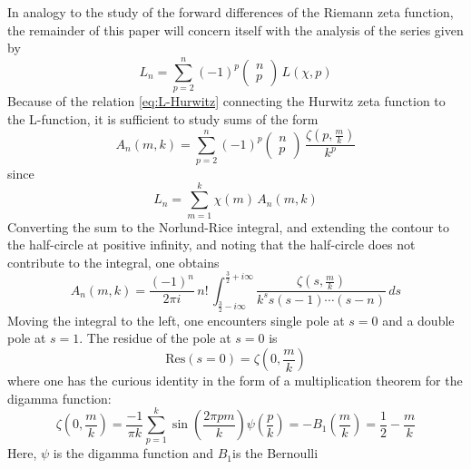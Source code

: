 \documentclass{amsart}
\begin{document}
\begin{comment}
Caution: I switched notation in the following, but haven't yet double-checked.
There may be errors.
\end{comment}
In analogy to the study of the forward differences of the Riemann
zeta function, the remainder of this paper will concern itself with
the analysis of the series given by \begin{equation}
L_{n}=\sum_{p=2}^{n}(-1)^{p}\left(\begin{array}{c}
n\\
p\end{array}\right)\, L(\chi,p)\label{eq:L-coeff}\end{equation}
 Because of the relation \ref{eq:L-Hurwitz} connecting the Hurwitz
zeta function to the L-function, it is sufficient to study sums of
the form\begin{equation}
A_{n}(m,k)=\sum_{p=2}^{n}(-1)^{p}\left(\begin{array}{c}
n\\
p\end{array}\right)\,\frac{\zeta\left(p,\frac{m}{k}\right)}{k^{p}}\label{eq:}\end{equation}
 since \begin{equation}
L_{n}=\sum_{m=1}^{k}\chi(m)\, A_{n}(m,k)\label{eq:}\end{equation}
 Converting the sum to the Norlund-Rice integral, and extending the
contour to the half-circle at positive infinity, and noting that the
half-circle does not contribute to the integral, one obtains \begin{equation}
A_{n}(m,k)=\frac{(-1)^{n}}{2\pi i}\, n!\,\int_{\frac{3}{2}-i\infty}^{\frac{3}{2}+i\infty}\frac{\zeta\left(s,\frac{m}{k}\right)}{k^{s}s(s-1)\cdots(s-n)}\, ds\label{eq:}\end{equation}
 Moving the integral to the left, one encounters single pole at $s=0$
and a double pole at $s=1$. The residue of the pole at $s=0$ is
\begin{equation}
\mbox{Res}(s=0)=\zeta\left(0,\frac{m}{k}\right)\label{eq:}\end{equation}
 where one has the curious identity in the form of a multiplication
theorem for the digamma function:\begin{equation}
\zeta\left(0,\frac{m}{k}\right)=\frac{-1}{\pi k}\sum_{p=1}^{k}\sin\left(\frac{2\pi pm}{k}\right)\psi\left(\frac{p}{k}\right)=-B_{1}\left(\frac{m}{k}\right)=\frac{1}{2}-\frac{m}{k}\label{eq:}\end{equation}
 Here, $\psi$ is the digamma function and $B_{1}$is the Bernoulli
\end{document}
